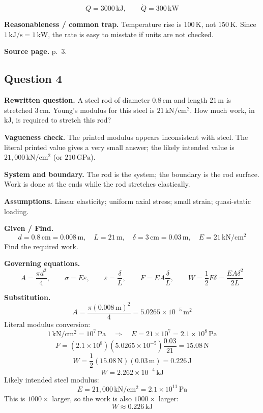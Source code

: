 \[
\boxed{Q=3000\,\mathrm{kJ}},\qquad \boxed{\dot Q=300\,\mathrm{kW}}
\]

\textbf{Reasonableness / common trap.} Temperature rise is $100\,\mathrm{K}$, not $150\,\mathrm{K}$. Since $1\,\mathrm{kJ/s}=1\,\mathrm{kW}$, the rate is easy to misstate if units are not checked.

\textbf{Source page.} p.~3.

\subsection*{Question 4}
\textbf{Rewritten question.} A steel rod of diameter $0.8\,\mathrm{cm}$ and length $21\,\mathrm{m}$ is stretched $3\,\mathrm{cm}$. Young's modulus for this steel is $21\,\mathrm{kN/cm^2}$. How much work, in $\mathrm{kJ}$, is required to stretch this rod?

\textbf{Vagueness check.} The printed modulus appears inconsistent with steel. The literal printed value gives a very small answer; the likely intended value is $21{,}000\,\mathrm{kN/cm^2}$ (or $210\,\mathrm{GPa}$).

\textbf{System and boundary.} The rod is the system; the boundary is the rod surface. Work is done at the ends while the rod stretches elastically.

\textbf{Assumptions.} Linear elasticity; uniform axial stress; small strain; quasi-static loading.

\textbf{Given / Find.}
\[
d=0.8\,\mathrm{cm}=0.008\,\mathrm{m},\quad L=21\,\mathrm{m},\quad \delta=3\,\mathrm{cm}=0.03\,\mathrm{m},\quad E=21\,\mathrm{kN/cm^2}
\]
Find the required work.

\textbf{Governing equations.}
\[
A=\frac{\pi d^2}{4},\qquad \sigma=E\varepsilon,\qquad \varepsilon=\frac{\delta}{L},\qquad F=EA\frac{\delta}{L},\qquad W=\frac12F\delta=\frac{EA\delta^2}{2L}
\]

\textbf{Substitution.}
\[
A=\frac{\pi(0.008\,\mathrm{m})^2}{4}=5.0265\times10^{-5}\,\mathrm{m^2}
\]
Literal modulus conversion:
\[
1\,\mathrm{kN/cm^2}=10^7\,\mathrm{Pa}\quad\Rightarrow\quad E=21\times10^7=2.1\times10^8\,\mathrm{Pa}
\]
\[
F=(2.1\times10^8)(5.0265\times10^{-5})\frac{0.03}{21}=15.08\,\mathrm{N}
\]
\[
W=\frac12(15.08\,\mathrm{N})(0.03\,\mathrm{m})=0.226\,\mathrm{J}
\]
\[
W=2.262\times10^{-4}\,\mathrm{kJ}
\]
Likely intended steel modulus:
\[
E=21{,}000\,\mathrm{kN/cm^2}=2.1\times10^{11}\,\mathrm{Pa}
\]
This is $1000\times$ larger, so the work is also $1000\times$ larger:
\[
W\approx0.226\,\mathrm{kJ}
\]


